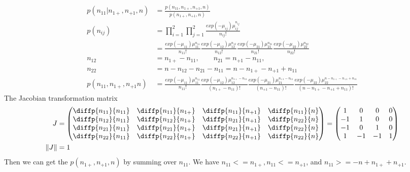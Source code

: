 \begin{align*}
	p(n_{11} | n_{1+}, n_{+1}, n) &= \frac{p(n_{11}, n_{1+}, n_{+1} ,n)}{p(n_{1+}, n_{+1}, n)}\\
		p(n_{ij}) &= \prod_{i=1}^2 \prod_{j=1}^2 \frac{exp(-\mu_{ij}) \mu_{ij}^{n_{ij}}}{n_{ij}!} \\
		&= \frac{exp(-\mu_{11})\mu_{11}^{n_{11}} }{n_{11}!} \frac{exp(-\mu_{12})\mu_{12}^{n_{12}}}{n_{12}!} \frac{exp(-\mu_{21})\mu_{21}^{n_{21}}}{n_{21}!} \frac{exp(-\mu_{22})\mu_{22}^{n_{22}}}{n_{22}!}\\
		n_{12} &= n_{1+} - n_{11}, \qquad n_{21} = n_{+1} - n_{11}, \\ n_{22} &= n - n_{12} - n_{21} - n_{11} = n- n_{1+} - n_{+1} + n_{11}\\
		p(n_{11}, n_{1+}, n_{+1} n) &= \frac{exp(-\mu_{11})\mu_{11}^{n_{11}} }{n_{11}!} \frac{exp(-\mu_{12})\mu_{12}^{n_{1+} - n_{11}}}{(n_{1+} - n_{11})!} \frac{exp(-\mu_{21})\mu_{21}^{n_{+1} - n_{11}}}{(n_{+1} - n_{11})!} \frac{exp(-\mu_{22})\mu_{22}^{n- n_{1+} - n_{+1} + n_{11}}}{(n- n_{1+} - n_{+1} + n_{11})!}
\end{align*}	
The Jacobian transformation matrix 
\begin{align*}
	J &=  \begin{pmatrix}
	\diffp{{n_{11}}}{{n_{11}}} & \diffp{{n_{11}}}{{n_{1+}}} & \diffp{{n_{11}}}{{n_{+1}}} & \diffp{{n_{11}}}{{n}}\\
	\diffp{{n_{12}}}{{n_{11}}} & \diffp{{n_{12}}}{{n_{1+}}} & \diffp{{n_{21}}}{{n_{+1}}} & \diffp{{n_{22}}}{{n}}\\
	\diffp{{n_{21}}}{{n_{11}}} & \diffp{{n_{21}}}{{n_{1+}}} & \diffp{{n_{21}}}{{n_{+1}}} & \diffp{{n_{22}}}{{n}}\\
	\diffp{{n_{22}}}{{n_{11}}} & \diffp{{n_{22}}}{{n_{1+}}} & \diffp{{n_{22}}}{{n_{+1}}} & \diffp{{n_{22}}}{{n}} \\
\end{pmatrix}= \begin{pmatrix}
1 & 0 & 0 & 0\\
-1 & 1 & 0 & 0\\
-1 & 0 & 1 & 0\\
1 & -1 & -1 & 1\\
\end{pmatrix}\\
\lVert J \rVert &= 1
\end{align*}
Then we can get the $p(n_{1+}, n_{+1}, n)$ by summing over $n_{11}$. We have $n_{11} <= n_{1+}, n_{11} <= n_{+1}$, and $n_{11} >= -n + n_{1+} + n_{+1}$. 		
